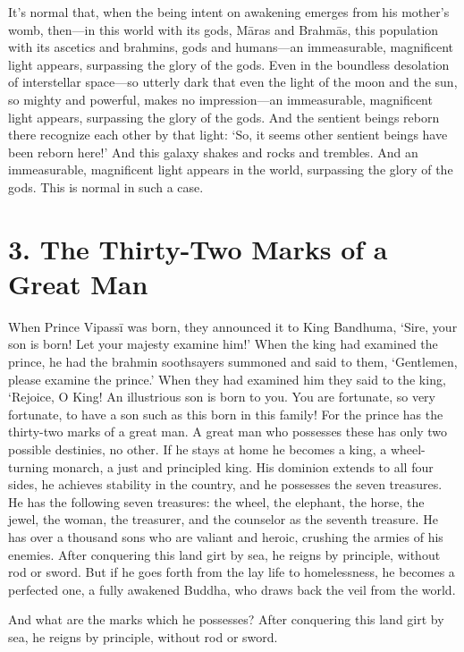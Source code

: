 \documentclass[12pt,openany]{book}%
\begin{document}
It’s normal that, when the being intent on awakening emerges from his mother’s womb, then—in this world with its gods, \textsanskrit{Māras} and \textsanskrit{Brahmās}, this population with its ascetics and brahmins, gods and humans—an immeasurable, magnificent light appears, surpassing the glory of the gods. Even in the boundless desolation of interstellar space—so utterly dark that even the light of the moon and the sun, so mighty and powerful, makes no impression—an immeasurable, magnificent light appears, surpassing the glory of the gods. And the sentient beings reborn there recognize each other by that light: ‘So, it seems other sentient beings have been reborn here!’ And this galaxy shakes and rocks and trembles. And an immeasurable, magnificent light appears in the world, surpassing the glory of the gods. This is normal in such a case. 

\section*{3. The Thirty-Two Marks of a Great Man }

When Prince \textsanskrit{Vipassī} was born, they announced it to King Bandhuma, ‘Sire, your son is born! Let your majesty examine him!’ When the king had examined the prince, he had the brahmin soothsayers summoned and said to them, ‘Gentlemen, please examine the prince.’ When they had examined him they said to the king, ‘Rejoice, O King! An illustrious son is born to you. You are fortunate, so very fortunate, to have a son such as this born in this family! For the prince has the thirty-two marks of a great man. A great man who possesses these has only two possible destinies, no other. If he stays at home he becomes a king, a wheel-turning monarch, a just and principled king. His dominion extends to all four sides, he achieves stability in the country, and he possesses the seven treasures. He has the following seven treasures: the wheel, the elephant, the horse, the jewel, the woman, the treasurer, and the counselor as the seventh treasure. He has over a thousand sons who are valiant and heroic, crushing the armies of his enemies. After conquering this land girt by sea, he reigns by principle, without rod or sword. But if he goes forth from the lay life to homelessness, he becomes a perfected one, a fully awakened Buddha, who draws back the veil from the world. 

And what are the marks which he possesses? After conquering this land girt by sea, he reigns by principle, without rod or sword. 
\end{document}
